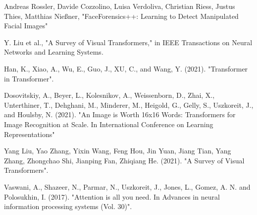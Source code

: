 \begin{thebibliography}{99}

     Andreas Rossler, Davide Cozzolino, Luisa Verdoliva, Christian Riess, Justus Thies, Matthias Nießner, "FaceForensics++: Learning to Detect Manipulated Facial Images"










     Y. Liu et al., "A Survey of Visual Transformers," in IEEE Transactions on Neural Networks and Learning Systems.

     Han, K., Xiao, A., Wu, E., Guo, J., XU, C., and Wang, Y. (2021). "Transformer in Transformer".

     Dosovitskiy, A., Beyer, L., Kolesnikov, A., Weissenborn, D., Zhai, X., Unterthiner, T., Dehghani, M., Minderer, M., Heigold, G., Gelly, S., Uszkoreit, J., and Houlsby, N. (2021). "An Image is Worth 16x16 Words: Transformers for Image Recognition at Scale. In International Conference on Learning Representations"

     Yang Liu, Yao Zhang, Yixin Wang, Feng Hou, Jin Yuan,
    Jiang Tian, Yang Zhang, Zhongchao Shi, Jianping Fan, Zhiqiang He. (2021). "A Survey of Visual Transformers".

     Vaswani, A., Shazeer, N., Parmar, N., Uszkoreit, J., Jones, L., Gomez, A. N. and Polosukhin, I. (2017). "Attention is all you need. In Advances in neural information processing systems (Vol. 30)".


\end{thebibliography}
